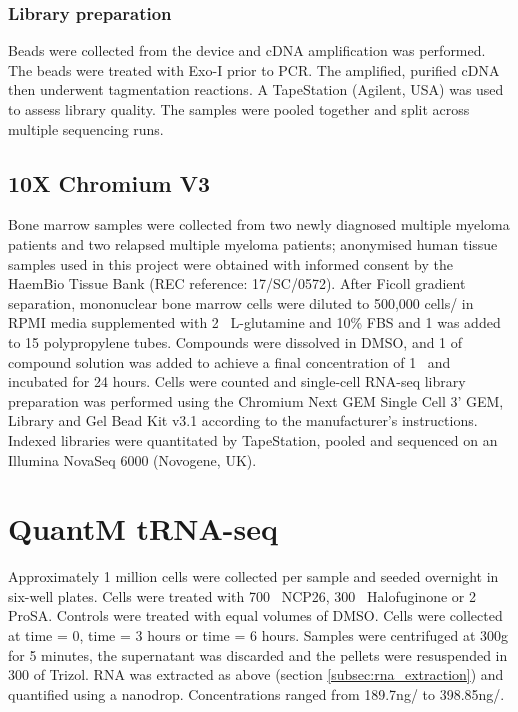\subsubsection{Library preparation}
Beads were collected from the device and cDNA amplification was performed.
The beads were treated with Exo-I prior to PCR.
The amplified, purified cDNA then underwent tagmentation reactions.
A TapeStation (Agilent, USA) was used to assess library quality.
The samples were pooled together and split across multiple sequencing runs.

\subsection{10X Chromium V3}\label{subsec:10x_method}
Bone marrow samples were collected from two newly diagnosed multiple myeloma patients and two relapsed multiple myeloma patients;
anonymised human tissue samples used in this project were obtained with informed consent by the HaemBio Tissue Bank (REC reference: 17/SC/0572).
After Ficoll gradient separation, mononuclear bone marrow cells were diluted to 500,000 cells/\ml{} in RPMI media supplemented with 2\si{\milli\Molar}
L-glutamine and 10\% FBS and 1\ml{} was added to 15\ml{} polypropylene tubes.
Compounds were dissolved in DMSO, and 1\ul{} of compound solution was added to achieve a final concentration of 1\si{\micro\Molar} and incubated for 24 hours.
Cells were counted and single-cell RNA-seq library preparation was performed using the Chromium Next GEM Single Cell 3' GEM, Library and Gel Bead Kit v3.1 according to the manufacturer's instructions.
Indexed libraries were quantitated by TapeStation, pooled and sequenced on an Illumina NovaSeq 6000 (Novogene, UK).

\section{QuantM tRNA-seq}\label{sec:quantm}
Approximately 1 million cells were collected per sample and seeded overnight in six-well plates.
Cells were treated with 700\si{\nano\Molar} NCP26, 300\si{\nano\Molar} Halofuginone or 2\si{\micro\Molar} ProSA.
Controls were treated with equal volumes of DMSO.
Cells were collected at time = 0, time = 3 hours or time = 6 hours.
Samples were centrifuged at 300g for 5 minutes, the supernatant was discarded and the pellets were resuspended in 300\ul{} of Trizol.
RNA was extracted as above (section \ref{subsec:rna_extraction}) and quantified using a nanodrop.
Concentrations ranged from  189.7\si{\ng}/\ul{} to 398.85\si{\ng}/\ul{}.

